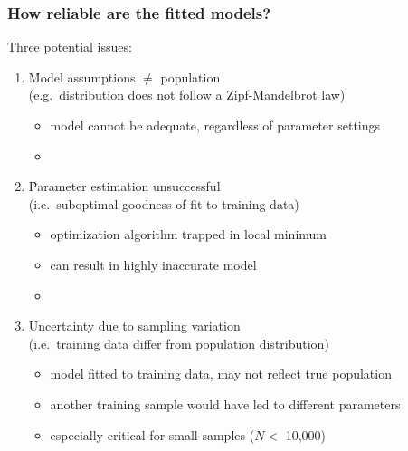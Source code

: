 \documentclass[handout,notes=show,t]{beamer} %
\begin{document}
\begin{frame}
  \frametitle{How reliable are the fitted models?}
  
  Three potential issues:
  \begin{enumerate}
  \item<2-> \h<5->{Model assumptions $\neq$ population}\\
    (e.g.\ distribution does not follow a Zipf-Mandelbrot law)
    \begin{itemize}
    \item[\hand] model cannot be adequate, regardless of parameter settings
    \item[]
    \end{itemize}
  \item<3-> \h<5->{Parameter estimation unsuccessful}\\
    (i.e.\ suboptimal goodness-of-fit to training data)
    \begin{itemize}
    \item[\hand] optimization algorithm trapped in local minimum
    \item[\hand] can result in highly inaccurate model
    \item[]
    \end{itemize}
  \item<4-> Uncertainty due to sampling variation\\
    (i.e.\ training data differ from population distribution)
    \begin{itemize}
    \item[\hand] model fitted to training data, may not reflect true population
    \item[\hand] another training sample would have led to different parameters
    \item[\hand] especially critical for small samples ($N < $ 10,000)
    \end{itemize}
  \end{enumerate}
\end{frame}
\end{document}
